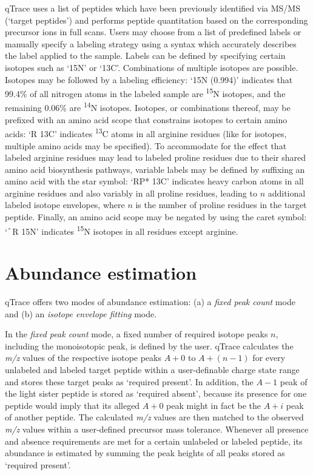 qTrace uses a list of peptides which have been previously identified via MS/MS
(`target peptides') and performs peptide quantitation based on the corresponding 
precursor ions in full scans.
Users may choose from a list of predefined labels or manually specify a 
labeling strategy using a syntax which accurately describes the label applied 
to the sample.
Labels can be defined by specifying certain isotopes such as `15N' or `13C'.
Combinations of multiple isotopes are possible. 
Isotopes may be followed by a labeling efficiency: `15N (0.994)'
indicates that 99.4\% of all nitrogen atoms in the labeled sample are 
\textsuperscript{15}N isotopes, and the remaining 0.06\% are 
\textsuperscript{14}N isotopes. 
Isotopes, or combinations thereof, may be prefixed with an 
amino acid scope that constrains isotopes to certain amino acids: 
`R 13C' indicates \textsuperscript{13}C atoms in all arginine residues (like for 
isotopes, multiple amino acids may be specified). 
To accommodate for the effect that labeled arginine residues may lead 
to labeled proline residues due to their shared amino acid biosynthesis pathways, 
variable labels may be defined by suffixing an amino acid with the star 
symbol: `RP* 13C' indicates heavy carbon atoms in all arginine residues 
and also variably in all proline residues, leading to $n$ additional labeled 
isotope envelopes, where $n$ is the number of proline residues in the target peptide.
Finally, an amino acid scope may be negated by using the caret symbol: 
`$\caret$R 15N' indicates \textsuperscript{15}N isotopes in all residues 
except arginine.

\section*{Abundance estimation}

qTrace offers two modes of abundance estimation: (a) a {\em fixed peak count} 
mode and (b) an {\em isotope envelope fitting} mode. 

In the {\em fixed peak count} mode, a fixed number of required isotope peaks $n$,
including the monoisotopic peak, is defined by the user.
qTrace calculates the {\em m/z} values of the respective isotope peaks 
\mbox{$A+0$} to $A+(n-1)$ for every unlabeled and labeled target peptide within 
a user-definable charge state range and stores these target peaks as 
`required present'. 
In addition, the $A-1$ peak of the light sister peptide is stored as 
`required absent', because its presence for one peptide would imply 
that its alleged $A+0$ peak might in fact be the $A+i$ peak of 
another peptide. 
The calculated {\em m/z} values are then matched to the observed {\em m/z} 
values within a user-defined precursor mass tolerance.
Whenever all presence and absence requirements are met for a certain unlabeled 
or labeled peptide, its abundance is estimated by summing the peak heights of 
all peaks stored as `required present'. 

